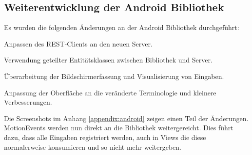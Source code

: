 \subsection{Weiterentwicklung der Android Bibliothek}
Es wurden die folgenden Änderungen an der Android Bibliothek durchgeführt:

\begin{compactitem}
	\item Anpassen des \ac{REST}-Clients an den neuen Server.
	\item Verwendung geteilter Entitätsklassen zwischen Bibliothek und Server.
	\item Überarbeitung der Bildschirmerfassung und Visualisierung von Eingaben.
	\item Anpassung der Oberfläche an die veränderte Terminologie und kleinere Verbesserungen.
\end{compactitem}

Die Screenshots im Anhang \ref{appendix:android} zeigen einen Teil der Änderungen.
MotionEvents werden nun direkt an die Bibliothek weitergereicht.
Dies führt dazu, dass alle Eingaben registriert werden, auch in Views die diese normalerweise konsumieren und so nicht mehr weitergeben. 